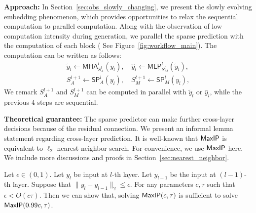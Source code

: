 \textbf{Approach:} In Section~\ref{sec:obs_slowly_changing}, we present the slowly evolving embedding phenomenon, which provides opportunities to relax the sequential computation to parallel computation. 
Along with the observation of low computation intensity during generation, we parallel the sparse prediction with the computation of each block ( See Figure~\ref{fig:workflow_main}).  The computation can be written as follows:
\begin{align*}
    \widetilde{y}_l \leftarrow \mathsf{MHA}^{l}_{S_A^l}(y_l), \quad
    \widehat{y}_l \leftarrow \mathsf{MLP}^{l}_{S_M^l}( \widetilde{y}_l ), \\
    S_{A}^{l+1} \leftarrow \mathsf{SP}_A^{l}(y_l), \quad
    S_M^{l+1}  \leftarrow \mathsf{SP}_M^{l}(y_l),
\end{align*}
We remark $S_{A}^{l+1}$ and $S_M^{l+1}$ can be computed in parallel with $\widetilde{y}_l$ or $\widehat{y}_l$, while the previous 4 steps are sequential.%




\textbf{Theoretical guarantee:} The sparse predictor can make further cross-layer decisions because of the residual connection. We present an informal lemma statement regarding cross-layer prediction. It is well-known that ${\sf MaxIP}$ is equivalent to $\ell_2$ nearest neighbor search. For convenience, we use ${\sf MaxIP}$ here. We include more discussions and proofs in Section~\ref{sec:nearest_neighbor}.
\begin{lemma}[Informal]
Let $\epsilon \in (0,1)$.
Let 
$y_l$ be input at $l$-th layer.
Let $y_{l-1}$ be the input at $(l-1)$-th layer. Suppose that $\| y_l - y_{l-1} \|_2 \leq \epsilon$. For any parameters $c, \tau$ such that $\epsilon < O(c \tau)$. Then we can show that, solving ${\sf MaxIP}(c,\tau)$ is sufficient to solve ${\sf MaxIP}(0.99 c, \tau )$.  
\end{lemma}



